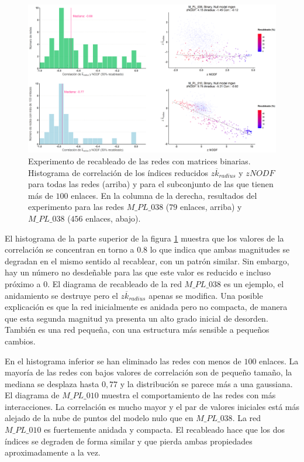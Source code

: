 \begin{figure}[h!]
\centering
\includegraphics[scale=0.35]{Figures/ESTATICA_histo_corr_rewiring_ES.eps}
\caption {Experimento de recableado de las redes con matrices binarias. Histograma de correlación de los índices reducidos $z \overline {k}_{radius}$ y $zNODF$ para todas las redes (arriba) y para el subconjunto de las que tienen más de $100$ enlaces. En la columna de la derecha, resultados del experimento para las redes  $M\_PL\_038$ ($79$ enlaces, arriba) y $M\_PL\_038$ ($456$ enlaces, abajo).}
\label{fig:ESTATICA_histo_corr_rewiring}
\end{figure}

El histograma de la parte superior de la figura \ref{fig:ESTATICA_histo_corr_rewiring} muestra que los valores de la correlación se concentran en torno a $0.8$ lo que indica que ambas magnitudes se degradan en el mismo sentido al recablear, con un patrón similar. Sin embargo, hay un número no desdeñable para las que este valor es reducido e incluso próximo a $0$. El diagrama de recableado de la red $M\_PL\_038$ es un ejemplo, el anidamiento se destruye pero el $z \overline {k}_{radius}$ apenas se modifica. Una posible explicación es que la red inicialmente es anidada pero no compacta, de manera que
esta segunda magnitud ya presenta un alto grado inicial de desorden. También es una red pequeña, con una estructura más sensible a pequeños cambios.

En el histograma inferior se han eliminado las redes con menos de $100$ enlaces. La mayoría de las redes con bajos valores de correlación son de pequeño tamaño, la mediana se desplaza hasta $0,77$ y la distribución se parece más a una gaussiana. El diagrama de $M\_PL\_010$ muestra el comportamiento de las redes con más interacciones. La correlación es mucho mayor y el par de valores iniciales está más alejado de la nube de puntos del modelo nulo que en $M\_PL\_038$. La red $M\_PL\_010$ es fuertemente anidada y compacta. El recableado hace que los dos índices se degraden de forma similar y que pierda ambas propiedades aproximadamente a la vez.

